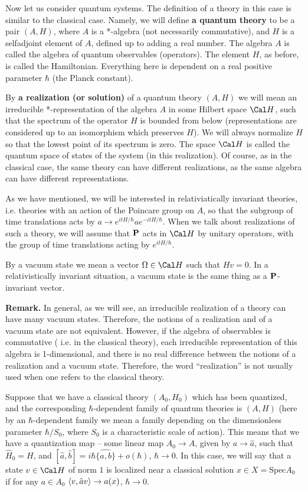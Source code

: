 Now let us consider quantum systems. The definition of
a theory in this case is similar to the classical case. 
Namely, we will define {\bf a quantum theory} to be a pair $(A,H)$, 
where $A$ is a *-algebra (not necessarily commutative), and 
$H$ is a selfadjoint element of $A$, defined up to adding 
a real number. The algebra $A$ is called the 
algebra of quantum observables (operators). 
The element $H$, as before, is called the 
Hamiltonian. Everything here is dependent on a real positive parameter 
$\hbar$ (the Planck constant). 

By {\bf a realization (or solution)} of
a quantum theory $(A,H)$ we will mean an irreducible *-representation  
of the algebra $A$ in some Hilbert space $\Cal H$,
such that the spectrum of the operator $H$ is bounded from below 
(representations are considered up to an isomorphism which preserves $H$). 
We will always normalize $H$ so that the lowest point of its spectrum is zero. 
The space $\Cal H$ is called the quantum space 
of states of the system (in this realization). Of course, as in the 
classical case, the same theory can have different realizations, 
as the same algebra can have different representations. 

As we have mentioned, we will be interested in relativiatically 
invariant theories, i.e. theories with an action of the Poincare group 
on $A$, so that the subgroup of time translations acts by 
$a\to e^{itH/\hbar}ae^{-itH/\hbar}$. 
When we talk about realizations of such a theory, 
we will assume that $\bold P$ acts in $\Cal H$ by unitary operators, with the group 
of time translations acting by $e^{itH/\hbar}$. 

By a vacuum state we mean a vector $\Omega\in \Cal H$ such that 
$Hv=0$. In a relativistically invariant situation, a vacuum state
is the same thing as a $\bold P$-invariant vector. 

{\bf Remark.} In general, as we will see, an irreducible realization of
a theory can have many vacuum states. Therefore, the notions
of a realization and of a vacuum state are not equivalent. However, 
if the algebra of observables is commutative
( i.e. in the classical theory), each irreducible representation 
of this algebra is 1-dimensional, and there is no real difference 
between the notions of a realization and a vacuum state. 
Therefore, the word ``realization'' is not usually used 
when one refers to the classical theory. 

Suppose that we have a classical theory $(A_0,H_0)$ which has 
been quantized, and the corresponding 
$\hbar$-dependent family of quantum theories is $(A,H)$
(here by an $\hbar$-dependent family we mean a family depending
on the dimensionless parameter $\hbar/S_0$, where $S_0$ is a   
characteristic scale of
action).
This means that we have a quantization map --
some linear map $A_0\to A$, given by 
$a\to \hat a$, such that $\hat H_0=H$, and 
$[\hat a,\hat b]=i\hbar\widehat{\{a,b\}}+o(\hbar)$, $\hbar\to 0$.   
In this case, we will say that a state $v\in \Cal H$ of norm $1$ 
is localized near a classical solution $x\in X=\text{Spec} A_0$ 
if for any $a\in A_0$ $\langle v,\hat av\rangle\to a(x)$, $\hbar \to 0$.

